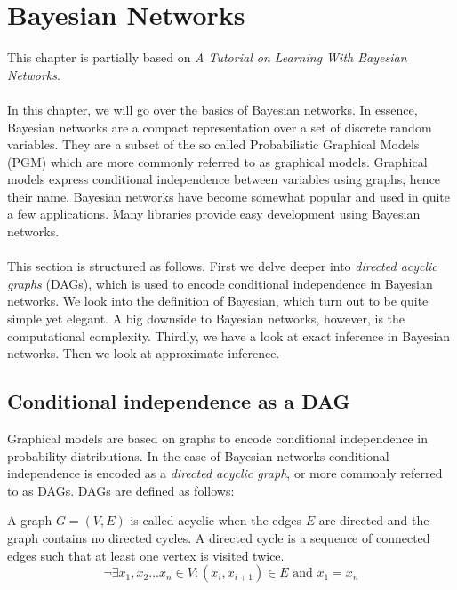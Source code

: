 \renewcommand{\this}{BayesianNetworks}

\chapter{Bayesian Networks}
This chapter is partially based on 
\textit{A Tutorial on Learning With Bayesian Networks}.
\\\\
In this chapter, we will go over the basics of 
Bayesian networks. In essence, Bayesian networks
are a compact representation over a set of discrete
random variables. They are a subset of the so called
Probabilistic Graphical Models (PGM) which are more
commonly referred to as graphical models. Graphical
models express conditional independence between 
variables using graphs, hence their name.
Bayesian networks have become somewhat popular and
used in quite a few applications. Many libraries
provide easy development using Bayesian networks.
\\\\
This section is structured as follows. First we delve
deeper into \textit{directed acyclic graphs} (DAGs), which
is used to encode conditional independence in Bayesian
networks. We look into the definition of Bayesian,
which turn out to be quite simple yet elegant. A
big downside to Bayesian networks, however, is the
computational complexity. Thirdly, we have a look 
at exact inference in Bayesian networks. Then we
look at approximate inference.

\section{Conditional independence as a DAG}
Graphical models are based on graphs to encode conditional independence 
in probability distributions. In the case of Bayesian networks conditional
independence is encoded as a \textit{directed acyclic graph}, or more 
commonly referred to as DAGs. DAGs are defined as follows:

\begin{defn}
A graph $G = (V, E)$ is called acyclic when the edges $E$ are directed
and the graph contains no directed cycles. A directed cycle is a 
sequence of connected edges such that at least one vertex is visited 
twice.
\begin{equation}
\lnot \exists x_1, x_2 \dots x_n \in V: (x_i, x_{i+1}) \in E \text{ and }
	x_1 = x_n
\end{equation}
\end{defn}

